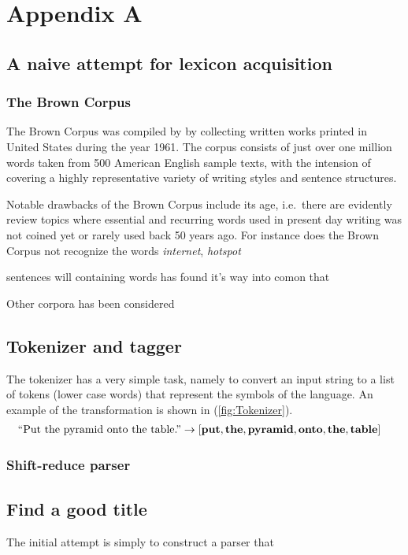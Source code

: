 \chapter{Appendix A}

\section{A naive attempt for lexicon acquisition}

\subsection{The Brown Corpus}
The Brown Corpus was compiled by \citeauthor{brown}  by collecting written works printed in United States during the year 1961. The corpus consists of just over one million words taken from 500 American English sample texts, with the intension of covering a highly representative variety of writing styles and sentence structures.

Notable drawbacks of the Brown Corpus include its age, i.e.\ there are evidently review topics where essential and recurring words used in present day writing was not coined yet or rarely used back 50 years ago. For instance does the Brown Corpus not recognize the words \emph{internet}, \emph{hotspot}

   sentences will containing words has found it's way into comon  that 

Other corpora has been considered

\section{Tokenizer and tagger}
The tokenizer has a very simple task, namely to convert an input string to a list of tokens (lower case words) that represent the symbols of the language. An example of the transformation is shown in
(\ref{fig:Tokenizer}).
\begin{align}
  &\text{``Put the pyramid onto the table.''} \to 
  \left[ 
  \mathbf{put}, \mathbf{the}, \mathbf{pyramid}, \mathbf{onto}, \mathbf{the}, \mathbf{table} 
  \right] 
  \label{fig:Tokenizer}
\end{align}

\subsection{Shift-reduce parser}
\section{Find a good title}
The initial attempt is simply to construct a parser that 

